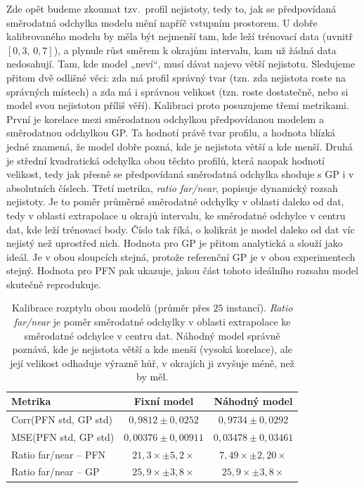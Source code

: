 Zde opět budeme zkoumat tzv.\ profil nejistoty, tedy to, jak se předpovídaná směrodatná odchylka modelu mění napříč vstupním prostorem.
U dobře kalibrovaného modelu by měla být nejmenší tam, kde leží trénovací data (uvnitř $[0{,}3,\, 0{,}7]$), a plynule růst směrem k okrajům intervalu, kam už žádná data nedosahují. 
Tam, kde model „neví“, musí dávat najevo větší nejistotu.
Sledujeme přitom dvě odlišné věci: zda má profil správný tvar (tzn. zda nejistota roste na správných místech) a zda má i správnou velikost (tzn. roste dostatečně, nebo si model svou nejistotou příliš věří).
Kalibraci proto posuzujeme třemi metrikami.
První je korelace mezi směrodatnou odchylkou předpovídanou modelem a směrodatnou odchylkou GP.
Ta hodnotí právě tvar profilu, a hodnota blízká jedné znamená, že model dobře pozná, kde je nejistota větší a kde menší.
Druhá je střední kvadratická odchylka obou těchto profilů, která naopak hodnotí velikost, tedy jak přesně se předpovídaná směrodatná odchylka shoduje s GP i v absolutních číslech.
Třetí metrika, \textit{ratio far/near}, popisuje dynamický rozsah nejistoty.
Je to poměr průměrné směrodatné odchylky v oblasti daleko od dat, tedy v oblasti extrapolace u okrajů intervalu, ke směrodatné odchylce v centru dat, kde leží trénovací body.
Číslo tak říká, o kolikrát je model daleko od dat víc nejistý než uprostřed nich.
Hodnota pro GP je přitom analytická a slouží jako ideál.
Je v obou sloupcích stejná, protože referenční GP je v obou experimentech stejný.
Hodnota pro PFN pak ukazuje, jakou část tohoto ideálního rozsahu model skutečně reprodukuje.
\par

\begin{table}[htbp]
\centering
\begin{tabular}{lcc}
\hline
Metrika & Fixní model & Náhodný model \\
\hline
Corr(PFN std, GP std) & $0{,}9812 \pm 0{,}0252$ & $0{,}9734 \pm 0{,}0292$ \\
MSE(PFN std, GP std) & $0{,}00376 \pm 0{,}00911$ & $0{,}03478 \pm 0{,}03461$ \\
Ratio far/near – PFN & $21{,}3\times \pm 5{,}2\times$ & $7{,}49\times \pm 2{,}20\times$ \\
Ratio far/near – GP  & $25{,}9\times \pm 3{,}8\times$ & $25{,}9\times \pm 3{,}8\times$ \\
\hline
\end{tabular}
\caption{Kalibrace rozptylu obou modelů (průměr přes $25$ instancí). \textit{Ratio far/near} je poměr směrodatné odchylky v oblasti extrapolace ke směrodatné odchylce v centru dat. Náhodný model správně poznává, kde je nejistota větší a kde menší (vysoká korelace), ale její velikost odhaduje výrazně hůř, v okrajích ji zvyšuje méně, než by měl.}
\label{tab:rand_calib}
\end{table}

